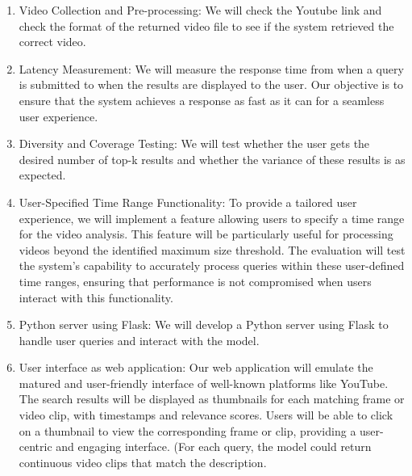 \documentclass[11pt]{article}
\begin{document}
\begin{enumerate}
    \item Video Collection and Pre-processing: We will check the Youtube link and check the format of the returned video file to see if the system retrieved the correct video.
    
    \item Latency Measurement: We will measure the response time from when a query is submitted to when the results are displayed to the user. Our objective is to ensure that the system achieves a response as fast as it can for a seamless user experience.
    
    \item Diversity and Coverage Testing: We will test whether the user gets the desired number of top-k results and whether the variance of these results is as expected.
    
    \item User-Specified Time Range Functionality: To provide a tailored user experience, we will implement a feature allowing users to specify a time range for the video analysis. 
    This feature will be particularly useful for processing videos beyond the identified maximum size threshold. 
    The evaluation will test the system's capability to accurately process queries within these user-defined time ranges, ensuring that performance is not compromised when users interact with this functionality.
    
    \item Python server using Flask: We will develop a Python server using Flask to handle user queries and interact with the model. 
    
    \item User interface as web application: Our web application will emulate the matured and user-friendly interface of well-known platforms like YouTube. The search results will be displayed as thumbnails for each matching frame or video clip, with timestamps and relevance scores. Users will be able to click on a thumbnail to view the corresponding frame or clip, providing a user-centric and engaging interface. (For each query, the model could return continuous video clips that match the description.
    

\end{enumerate}
\end{document}
